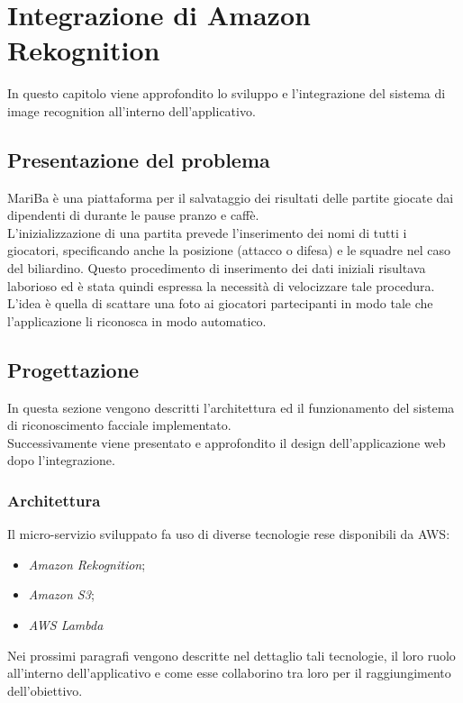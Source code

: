 
\chapter{Integrazione di Amazon Rekognition}
\label{cap:rekognition}

In questo capitolo viene approfondito lo sviluppo e l'integrazione del sistema di image recognition all'interno dell'applicativo.\\


\section{Presentazione del problema}
MariBa è una piattaforma per il salvataggio dei risultati delle partite giocate dai dipendenti di \azienda durante le 
pause pranzo e caffè. \\
L'inizializzazione di una partita prevede l'inserimento dei nomi di tutti i giocatori, specificando anche la posizione (attacco o difesa) e le squadre nel caso del biliardino. Questo procedimento di inserimento dei dati iniziali
risultava laborioso ed è stata quindi espressa la necessità di velocizzare tale procedura. \\
L'idea è quella di scattare una foto ai giocatori partecipanti in modo tale che l'applicazione li riconosca in modo automatico.

\section{Progettazione}
In questa sezione vengono descritti l'architettura ed il funzionamento del sistema di riconoscimento facciale implementato. \\
Successivamente viene presentato e approfondito il design dell'applicazione web dopo l'integrazione.

	\subsection{Architettura}
	 Il micro-servizio sviluppato fa uso di diverse tecnologie rese disponibili da \gls{AWS}: 
	 \begin{itemize}
	 	\item \emph{Amazon Rekognition};
	 	\item \emph{Amazon S3};
	 	\item \emph{AWS Lambda}
	 \end{itemize}
 	Nei prossimi paragrafi vengono descritte nel dettaglio tali tecnologie, il loro ruolo all'interno dell'applicativo e come esse collaborino tra loro per il raggiungimento dell'obiettivo.
	

